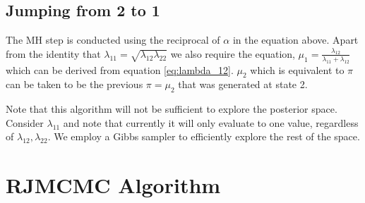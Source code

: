 \documentclass{article}
\begin{document}
\subsection{Jumping from 2 to 1}
The MH step is conducted using the reciprocal of $\alpha$ in the equation above. Apart from the identity that $\lambda_{11}=\sqrt{\lambda_{12}\lambda_{22}}$ we also require the equation, $\mu_1=\frac{\lambda_{12}}{\lambda_{11}+\lambda_{12}}$ which can be derived from equation \ref{eq:lambda_12}. $\mu_2$ which is equivalent to $\pi$ can be taken to be the previous $\pi=\mu_2$ that was generated at state 2.

Note that this algorithm will not be sufficient to explore the posterior space. Consider $\lambda_{11}$ and note that currently it will only evaluate to one value, regardless of $\lambda_{12}, \lambda_{22}$. We employ a Gibbs sampler to efficiently explore the rest of the space.

 \section{RJMCMC Algorithm}
\end{document}
